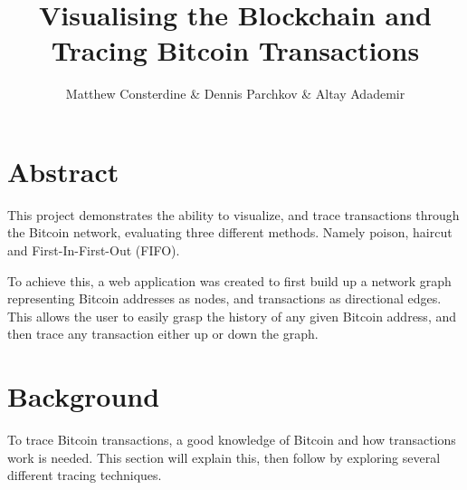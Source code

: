 \documentclass{article}
\title{Visualising the Blockchain and Tracing Bitcoin Transactions}
\author{Matthew Consterdine \& Dennis Parchkov \& Altay Adademir}
\date{}
\begin{document}
\vspace*{-5em}

\begin{figure}[H]
  \centering
  \label{fig:distancecolouringtitle}
\end{figure}
\vspace*{-3em}

\section*{Abstract}

This project demonstrates the ability to visualize, and trace transactions through the Bitcoin network, evaluating three different methods. Namely poison, haircut and First-In-First-Out (FIFO). 

To achieve this, a web application was created to first build up a network graph representing Bitcoin addresses as nodes, and transactions as directional edges. This allows the user to easily grasp the history of any given Bitcoin address, and then trace any transaction either up or down the graph.

\section{Background}

To trace Bitcoin transactions, a good knowledge of Bitcoin and how transactions work is needed. This section will explain this, then follow by exploring several different tracing techniques.
\end{document}
